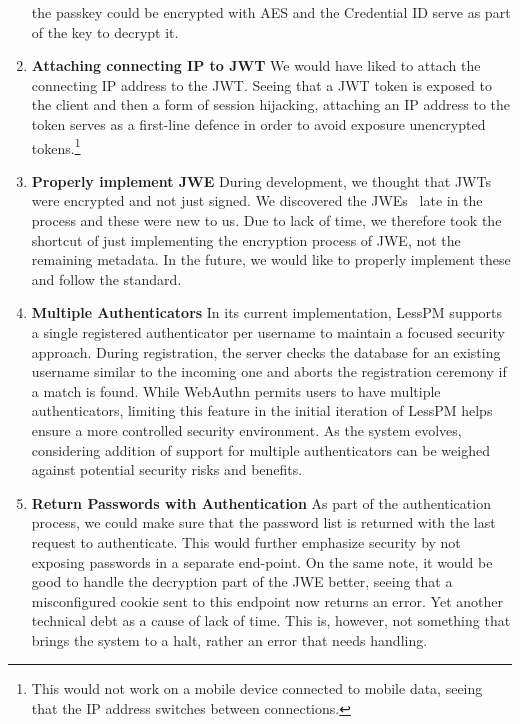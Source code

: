 \begin{enumerate}[label=$\blacktriangleright$]
        the passkey could be encrypted with AES and the Credential ID serve
        as part of the key to decrypt it.
        \item \textbf{Attaching connecting IP to JWT}
        \newline We would have liked to attach the connecting IP address to the
        JWT\@.
        Seeing that a JWT token is exposed to the client and then a form of
        session hijacking, attaching an IP address to the token serves as a
        first-line defence in order to avoid exposure unencrypted
        tokens.\footnote{
            This would not work on a mobile device connected to mobile data,
            seeing that the IP address switches between connections.
        }
        \item \textbf{Properly implement JWE}
        \newline During development, we thought that JWTs were encrypted and
        not just signed.
        We discovered the JWEs~\cite{rfc7516} late in the process and these
        were new to us.
        Due to lack of time, we therefore took the shortcut of just
        implementing the encryption process of JWE, not the remaining metadata.
        In the future, we would like to properly implement these and follow
        the standard.
        \item \textbf{Multiple Authenticators}
        \newline In its current implementation, LessPM supports a single
        registered authenticator per username to maintain a focused security
        approach.
        During registration, the server checks the database for an existing
        username similar to the incoming one and aborts the registration
        ceremony if a match is found.
        While WebAuthn permits users to have multiple authenticators, limiting
        this feature in the initial iteration of LessPM helps ensure a more
        controlled security environment.
        As the system evolves, considering addition of support for multiple
        authenticators can be weighed against potential security risks and
        benefits.
        \item \textbf{Return Passwords with Authentication}
        \newline As part of the authentication process, we could make sure
        that the password list is returned with the last request to
        authenticate.
        This would further emphasize security by not exposing passwords in a
        separate end-point.
        On the same note, it would be good to handle the decryption part of
        the JWE better, seeing that a misconfigured cookie sent to this
        endpoint now returns an error.
        Yet another technical debt as a cause of lack of time.
        This is, however, not something that brings the system to a halt,
        rather an error that needs handling.
    \end{enumerate}